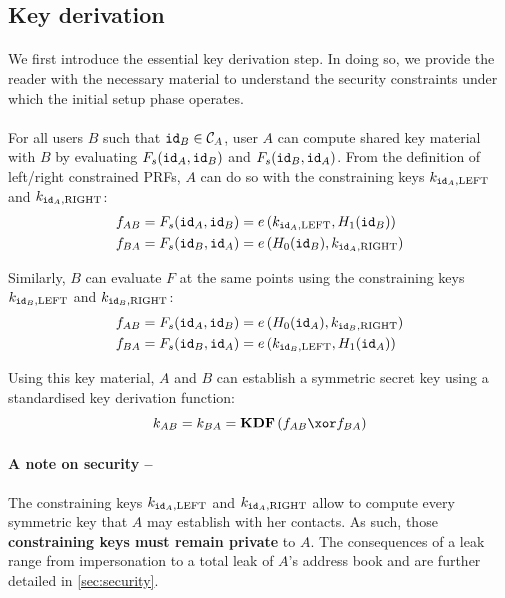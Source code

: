 	\subsection{Key derivation}
	
		\paragraph{} We first introduce the essential key derivation step. In doing so, we provide the reader with the necessary material to understand the security constraints under which the initial setup phase operates.
		
		\paragraph{} For all users $B$ such that $\mathtt{id}_B \in \mathcal{C}_A$, user $A$ can compute shared key material with $B$ by evaluating $F_s(\mathtt{id}_A, \mathtt{id}_B)$ and $F_s(\mathtt{id}_B, \mathtt{id}_A)$. From the definition of left/right constrained PRFs, $A$ can do so with the constraining keys $k_{\mathtt{id}_A,\mathrm{LEFT}}$ and $k_{\mathtt{id}_A,\mathrm{RIGHT}}$:
		\begin{align}
			f_{AB} = F_s(\mathtt{id}_A, \mathtt{id}_B) &= e\left(k_{\mathtt{id}_A,\mathrm{LEFT}}, H_1(\mathtt{id}_B) \right) \\
			f_{BA} = F_s(\mathtt{id}_B, \mathtt{id}_A) &= e\left(H_0(\mathtt{id}_B), k_{\mathtt{id}_A,\mathrm{RIGHT}} \right)
		\end{align} 
	
	\noindent Similarly, $B$ can evaluate $F$ at the same points using the constraining keys $k_{\mathtt{id}_B,\mathrm{LEFT}}$ and $k_{\mathtt{id}_B,\mathrm{RIGHT}}$:		
		\begin{align}
			f_{AB} = F_s(\mathtt{id}_A, \mathtt{id}_B) &= e\left(H_0(\mathtt{id}_A), k_{\mathtt{id}_B,\mathrm{RIGHT}} \right) \\
			f_{BA} = F_s(\mathtt{id}_B, \mathtt{id}_A) &= e\left(k_{\mathtt{id}_B,\mathrm{LEFT}}, H_1(\mathtt{id}_A) \right) 
		\end{align}
	
\noindent Using this key material, $A$ and $B$ can establish a symmetric secret key using a standardised key derivation function:
	\begin{equation}
		k_{AB} = k_{BA} = \mathbf{KDF}\left(f_{AB} \xor f_{BA}\right)
	\end{equation}
	
	\paragraph{A note on security --} The constraining keys $k_{\mathtt{id}_A,\mathrm{LEFT}}$ and $k_{\mathtt{id}_A,\mathrm{RIGHT}}$ allow to compute every symmetric key that $A$ may establish with her contacts. As such, those \textbf{constraining keys must remain private} to $A$. The consequences of a leak range from impersonation to a total leak of $A$'s address book and are further detailed in \autoref{sec:security}.
	
